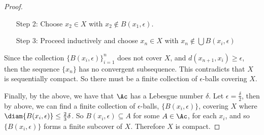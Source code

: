 \begin{proof}
\begin{enumerate}
        \item[Step 2:] Choose $x_2 \in X$ with $x_2 \notin B(x_1,\epsilon)$.

        \item[Step 3:] Proceed inductively and choose $x_n \in X$ with  $x_n
            \notin \bigcup{B(x_i,\epsilon)}$
    \end{enumerate}

    Since the collection $\{B(x_i,\epsilon)\}_{i=1}^n$ does not cover $X$, and
    $d(x_{n+1},x_i) \geq \epsilon$, then the sequence $\{x_n\}$ has no
    convergent subsequence. This contradicts that $X$ is sequentially compact.
    So there must be a finite collection of $\epsilon$-balls covering  $X$.

    Finally, by the above, we have that  $\Ac$ has a Lebesgue number $\delta$.
    Let  $\epsilon=\frac{\delta}{2}$, then by above, we can find a finite
    collection of $\epsilon$-balls, $\{B(x_i,\epsilon)\}$, covering $X$ where
    $\diam{B(x_i,\epsilon)} \leq \frac{2}{3}\delta$. So $B(x_i,\epsilon)
    \subseteq A$ for some $A \in \Ac$, for each $x_i$, and so
    $\{B(x_i,\epsilon)\}$ forms a finite subcover of $X$. Therefore $X$ is
    compact.
\end{proof}
